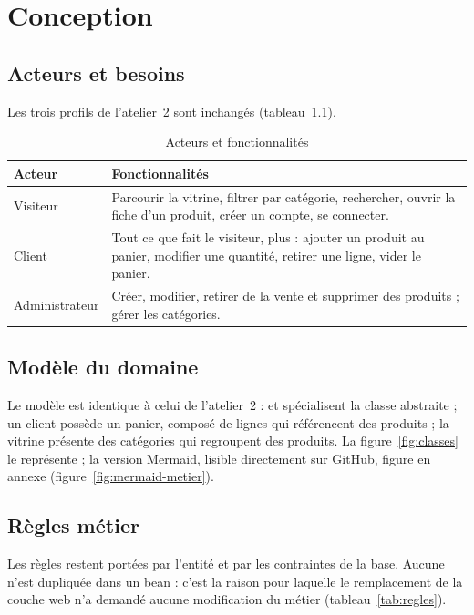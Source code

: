 \chapter{Conception}\label{chap:conception}

\section{Acteurs et besoins}
Les trois profils de l'atelier~2 sont inchangés (tableau~\ref{tab:acteurs}).

\begin{table}[htbp]
\centering
\caption{Acteurs et fonctionnalités}\label{tab:acteurs}
\begin{tabularx}{\linewidth}{@{}lX@{}}
\toprule
\textbf{Acteur} & \textbf{Fonctionnalités}\\
\midrule
Visiteur & Parcourir la vitrine, filtrer par catégorie, rechercher, ouvrir la fiche d'un produit, créer un compte, se connecter.\\
Client & Tout ce que fait le visiteur, plus : ajouter un produit au panier, modifier une quantité, retirer une ligne, vider le panier.\\
Administrateur & Créer, modifier, retirer de la vente et supprimer des produits ; gérer les catégories.\\
\bottomrule
\end{tabularx}
\end{table}

\section{Modèle du domaine}
Le modèle est identique à celui de l'atelier~2 :  et  spécialisent la classe
abstraite  ; un client possède un panier, composé de lignes qui référencent des produits ; la
vitrine présente des catégories qui regroupent des produits. La figure~\ref{fig:classes} le représente ; la
version Mermaid, lisible directement sur GitHub, figure en annexe (figure~\ref{fig:mermaid-metier}).

\begin{landscape}
\thispagestyle{empty}
\centering
\resizebox{\linewidth}{!}{}
\label{fig:classes}
\end{landscape}

\section{Règles métier}
Les règles restent portées par l'entité  et par les contraintes de la base. Aucune n'est dupliquée dans
un bean : c'est la raison pour laquelle le remplacement de la couche web n'a demandé aucune modification du métier
(tableau~\ref{tab:regles}).

